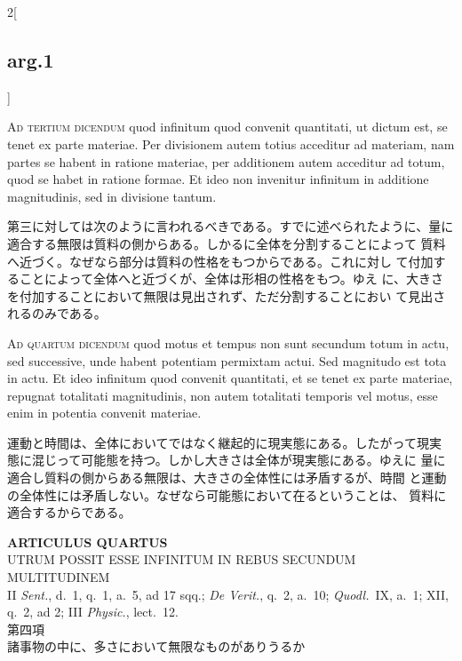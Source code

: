 \documentclass[paper=a4paper,fontsize=10pt,jafontsize=9pt,titlepage]{jlreq}
\begin{document}
\begin{paracol}{2}[\subsection{arg.1}]
\switchcolumn*[\subsection{ad.3}]

{\scshape Ad tertium dicendum} quod infinitum quod convenit quantitati, ut dictum
 est, se tenet ex parte materiae. Per divisionem autem totius acceditur
 ad materiam, nam partes se habent in ratione materiae, per additionem
 autem acceditur ad totum, quod se habet in ratione formae. Et ideo non
 invenitur infinitum in additione magnitudinis, sed in divisione tantum.

\switchcolumn

第三に対しては次のように言われるべきである。すでに述べられたように、量に
 適合する無限は質料の側からある。しかるに全体を分割することによって
 質料へ近づく。なぜなら部分は質料の性格をもつからである。これに対し
 て付加することによって全体へと近づくが、全体は形相の性格をもつ。ゆえ
 に、大きさを付加することにおいて無限は見出されず、ただ分割することにおい
 て見出されるのみである。

\switchcolumn*[\subsection{ad.4}]

{\scshape Ad quartum dicendum} quod motus et tempus non sunt secundum totum in
 actu, sed successive, unde habent potentiam permixtam actui. Sed
 magnitudo est tota in actu. Et ideo infinitum quod convenit quantitati,
 et se tenet ex parte materiae, repugnat totalitati magnitudinis, non
 autem totalitati temporis vel motus, esse enim in potentia convenit
 materiae.

\switchcolumn

運動と時間は、全体においてではなく継起的に現実態にある。したがって現実
 態に混じって可能態を持つ。しかし大きさは全体が現実態にある。ゆえに
 量に適合し質料の側からある無限は、大きさの全体性には矛盾するが、時間
 と運動の全体性には矛盾しない。なぜなら可能態において在るということは、
 質料に適合するからである。

\end{paracol}
\newpage
{}
 

\begin{center}
 {\Large {\bfseries ARTICULUS QUARTUS}}\\
 {\large UTRUM POSSIT ESSE INFINITUM IN REBUS SECUNDUM MULTITUDINEM}\\
 {\footnotesize II {\itshape Sent.}, d.~1, q.~1, a.~5, ad 17 sqq.;
 {\itshape De Verit.}, q.~2, a.~10; {\itshape Quodl.}~IX, a.~1; XII,
 q.~2, ad 2; III {\itshape Physic.}, lect.~12.}\\
 {\Large 第四項\\諸事物の中に、多さにおいて無限なものがありうるか}
\end{center}
\end{document}
